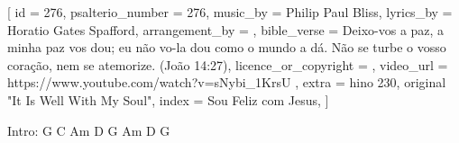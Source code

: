 [
    id                     = {276},
    psalterio_number       = {276},
    music_by               = {Philip Paul Bliss},
    lyrics_by              = {Horatio Gates Spafford},
    arrangement_by         = {},
    bible_verse            = {Deixo-vos a paz, a minha paz vos dou; eu não vo-la dou como o mundo a dá. Não se turbe o vosso coração, nem se atemorize. (João 14:27)},
    licence_or_copyright   = {},
    video_url              = {https://www.youtube.com/watch?v=sNybi_1KrsU
},
    extra                  = {hino 230, original "It Is Well With My Soul"},
    index                  = {Sou Feliz com Jesus},
]


\beginverse
Intro:
G C Am D
G Am D G

\endverse


\beginverse

